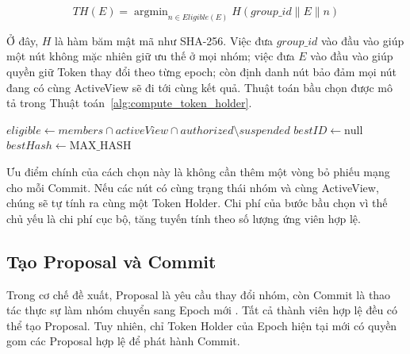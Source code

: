 \documentclass[../DoAn.tex]{subfiles}
\begin{document}
\begin{equation}
\label{eq:token_holder_hash}
TH(E) = \operatorname{argmin}_{n \in Eligible(E)} H(group\_id \parallel E \parallel n)
\end{equation}

Ở đây, $H$ là hàm băm mật mã như SHA-256. Việc đưa $group\_id$ vào đầu vào giúp một nút không mặc nhiên giữ ưu thế ở mọi nhóm; việc đưa $E$ vào đầu vào giúp quyền giữ Token thay đổi theo từng epoch; còn định danh nút bảo đảm mọi nút đang có cùng ActiveView sẽ đi tới cùng kết quả. Thuật toán bầu chọn được mô tả trong Thuật toán~\ref{alg:compute_token_holder}.

\begin{algorithm}[htbp]
\small
\SetAlgoLined
{}
\BlankLine
$eligible \leftarrow members \cap activeView \cap authorized \setminus suspended$\;
$bestID \leftarrow \text{null}$\;
$bestHash \leftarrow \text{MAX\_HASH}$\;
\;
\caption{Thuật toán bầu chọn Token Holder ($ComputeTokenHolder$)}
\label{alg:compute_token_holder}
\end{algorithm}

Ưu điểm chính của cách chọn này là không cần thêm một vòng bỏ phiếu mạng cho mỗi Commit. Nếu các nút có cùng trạng thái nhóm và cùng ActiveView, chúng sẽ tự tính ra cùng một Token Holder. Chi phí của bước bầu chọn vì thế chủ yếu là chi phí cục bộ, tăng tuyến tính theo số lượng ứng viên hợp lệ.

\subsection{Tạo Proposal và Commit}

Trong cơ chế đề xuất, Proposal là yêu cầu thay đổi nhóm, còn Commit là thao tác thực sự làm nhóm chuyển sang Epoch mới \cite{rfc9420}. Tất cả thành viên hợp lệ đều có thể tạo Proposal. Tuy nhiên, chỉ Token Holder của Epoch hiện tại mới có quyền gom các Proposal hợp lệ để phát hành Commit.
\end{document}
